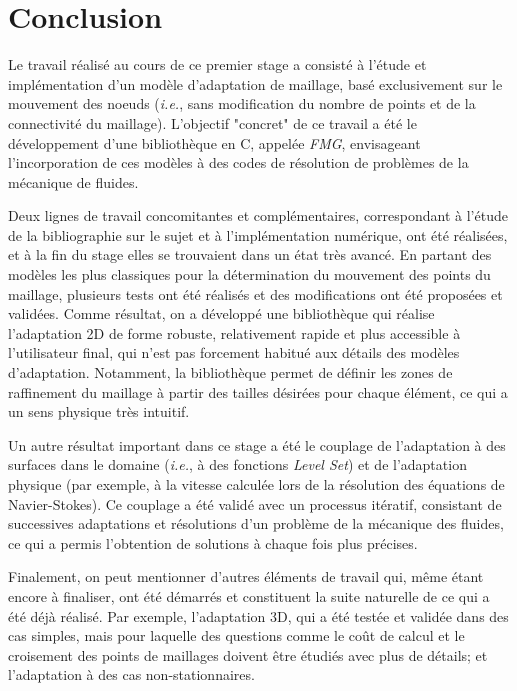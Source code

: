 \section{Conclusion}

\indent Le travail réalisé au cours de ce premier stage a consisté à l'étude et implémentation d'un modèle d'adaptation de maillage, basé exclusivement sur le mouvement des noeuds (\emph{i.e.}, sans modification du nombre de points et de la connectivité du maillage). L'objectif "concret" de ce travail a été le développement d'une bibliothèque en C, appelée \emph{FMG}, envisageant l'incorporation de ces modèles à des codes de résolution de problèmes de la mécanique de fluides.

\indent Deux lignes de travail concomitantes et complémentaires, correspondant à l'étude de la bibliographie sur le sujet et à l'implémentation numérique, ont été réalisées, et à la fin du stage elles se trouvaient dans un état très avancé. En partant des modèles les plus classiques pour la détermination du mouvement des points du maillage, plusieurs tests ont été réalisés et des modifications ont été proposées et validées. Comme résultat, on a développé une bibliothèque qui réalise l'adaptation 2D de forme robuste, relativement rapide et plus accessible à l'utilisateur final, qui n'est pas forcement habitué aux détails des modèles d'adaptation. Notamment, la bibliothèque permet de définir les zones de raffinement du maillage à partir des tailles désirées pour chaque élément, ce qui a un sens physique très intuitif.

\indent Un autre résultat important dans ce stage a été le couplage de l'adaptation à des surfaces dans le domaine (\emph{i.e.}, à des fonctions \emph{Level Set}) et de l'adaptation physique (par exemple, à la vitesse calculée lors de la résolution des équations de Navier-Stokes). Ce couplage a été validé avec un processus itératif, consistant de successives adaptations et résolutions d'un problème de la mécanique des fluides, ce qui a permis l'obtention de solutions à chaque fois plus précises.

\indent Finalement, on peut mentionner d'autres éléments de travail qui, même étant encore à finaliser, ont été démarrés et constituent la suite naturelle de ce qui a été déjà réalisé. Par exemple, l'adaptation 3D, qui a été testée et validée dans des cas simples, mais pour laquelle des questions comme le coût de calcul et le croisement des points de maillages doivent être étudiés avec plus de détails; et l'adaptation à des cas non-stationnaires.

  